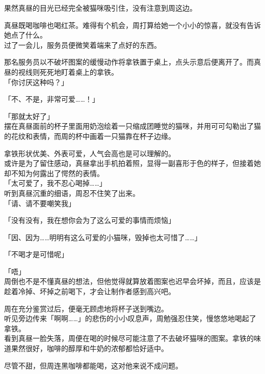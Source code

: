 果然真昼的目光已经完全被猫咪吸引住，没有注意到周这边。

真昼既喝咖啡也喝红茶。难得有个机会，周打算给她一个小小的惊喜，就没有告诉她点了什么。\\

过了一会儿，服务员便微笑着端来了点好的东西。

那名服务员以不破坏图案的缓慢动作将拿铁置于桌上，点头示意后便离开了。而真昼的视线则死死地盯着桌上的拿铁。\\

「你讨厌这种吗？」

「不、不是，非常可爱……！」

「那就太好了」\\

摆在真昼面前的杯子里面用奶泡绘着一只缩成团睡觉的猫咪，并用可可勾勒出了猫的花纹和表情，而周的杯中画着一只猫靠在杯子边缘。

拿铁形状优美、外表可爱，人气会高也是可以理解的。\\

或许是为了留住感动，真昼拿出手机拍着照，显得一副喜形于色的样子，但接着她却不知为何露出了愕然的表情。\\

「太可爱了，我不忍心喝掉……」\\

听到真昼沉重的细语，周忍不住笑了出来。\\

「请、请不要嘲笑我」

「没有没有，我在想你会为了这么可爱的事情而烦恼」

「因、因为……明明有这么可爱的小猫咪，毁掉也太可惜了……」

「不喝才是可惜呢」

「唔」\\

周倒也不是不懂真昼的想法，但他觉得就算放着图案也迟早会坏掉，而且，应该是趁着冷掉、坏掉之前喝下，才会让制作者感到高兴吧。

周在充分鉴赏过后，便毫无顾虑地将杯子送到嘴边。\\

听见旁边传来「啊啊……」的悲伤的小小叹息声，周勉强忍住笑，慢悠悠地喝起了拿铁。\\

看到真昼一脸失落，周便在喝的时候尽可能注意了不去破坏猫咪的图案。拿铁的味道果然很好，咖啡的醇厚和牛奶的浓郁都恰好适中。

尽管不甜，但周连黑咖啡都能喝，这对他来说不成问题。\\

